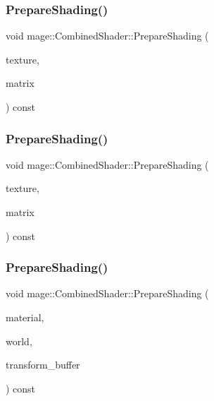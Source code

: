 \subsubsection{\texorpdfstring{Prepare\+Shading()}{PrepareShading()}\hspace{0.1cm}{\footnotesize\ttfamily [1/3]}}
{\footnotesize\ttfamily void mage\+::\+Combined\+Shader\+::\+Prepare\+Shading (\begin{DoxyParamCaption}\item[{const \hyperlink{classmage_1_1_texture}{Texture} \&}]{texture,  }\item[{const X\+M\+M\+A\+T\+R\+IX \&}]{matrix }\end{DoxyParamCaption}) const}

\hypertarget{structmage_1_1_combined_shader_acbb0b2257e3ffe5fd7aade0851c0fb95}{}\label{structmage_1_1_combined_shader_acbb0b2257e3ffe5fd7aade0851c0fb95} 
\subsubsection{\texorpdfstring{Prepare\+Shading()}{PrepareShading()}\hspace{0.1cm}{\footnotesize\ttfamily [2/3]}}
{\footnotesize\ttfamily void mage\+::\+Combined\+Shader\+::\+Prepare\+Shading (\begin{DoxyParamCaption}\item[{I\+D3\+D11\+Shader\+Resource\+View $\ast$const $\ast$}]{texture,  }\item[{const X\+M\+M\+A\+T\+R\+IX \&}]{matrix }\end{DoxyParamCaption}) const}

\hypertarget{structmage_1_1_combined_shader_a896024e565638a4f36d83ad30e540e50}{}\label{structmage_1_1_combined_shader_a896024e565638a4f36d83ad30e540e50} 
\subsubsection{\texorpdfstring{Prepare\+Shading()}{PrepareShading()}\hspace{0.1cm}{\footnotesize\ttfamily [3/3]}}
{\footnotesize\ttfamily void mage\+::\+Combined\+Shader\+::\+Prepare\+Shading (\begin{DoxyParamCaption}\item[{const \hyperlink{structmage_1_1_material}{Material} \&}]{material,  }\item[{const \hyperlink{classmage_1_1_world}{World} \&}]{world,  }\item[{const Transform\+Buffer \&}]{transform\+\_\+buffer }\end{DoxyParamCaption}) const}



